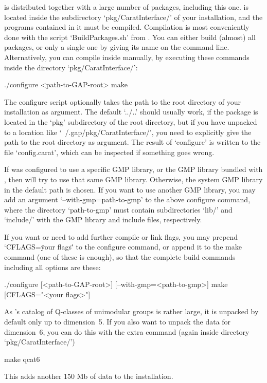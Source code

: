 
{\GAP} is distributed together with a large number of packages, including
this one. {\CaratInterface} is located inside the subdirectory
`pkg/CaratInterface/' of your {\GAP} installation, and the {\CARAT}
programs contained in it must be compiled. Compilation is most
conveniently done with the script `BuildPackages.sh' from {\GAP}.
You can either build (almost) all packages, or only a single one
by giving its name on the command line. Alternatively, you can
compile {\CARAT} inside {\CaratInterface} manually, by executing
these commands inside the directory `pkg/CaratInterface/':

\begintt
./configure <path-to-GAP-root>
make
\endtt

The configure script optionally takes the path to the root directory of 
your {\GAP} installation as argument. The default `../..' should usually 
work, if the package is located in the `pkg' subdirectory of the {\GAP}
root directory,
but if you have unpacked {\CaratInterface} to a location like
`~/.gap/pkg/CaratInterface/', you need to explicitly give the path to
the {\GAP} root directory as argument. The result of `configure' is
written to the file `config.carat', which can be inspected if something
goes wrong.

If {\GAP} was configured to use a specific GMP library, or the GMP library
bundled with {\GAP}, then {\CARAT} will try to use that same GMP library.
Otherwise, the system GMP library in the default path is chosen. If you want
to use another GMP library, you may add an argument `--with-gmp=path-to-gmp'
to the above configure command, where the directory `path-to-gmp' must
contain subdirectories `lib/' and `include/' with the GMP library and include
files, respectively.

If you want or need to add further compile or link flags, you may prepend
`CFLAGS=\"your flags\"' to the configure command, or append it to the make
command (one of these is enough), so that the complete build commands
including all options are these:

\begintt
 [CFLAGS="<your flags>"] ./configure [<path-to-GAP-root>] [--with-gmp=<path-to-gmp>]
 make [CFLAGS="<your flags>"]
\endtt

As {\CARAT}'s catalog of Q-classes of unimodular groups is rather large,
it is unpacked by default only up to dimension~5. If you also want
to unpack the data for dimension~6, you can do this with the extra
command (again inside directory `pkg/CaratInterface/')

\begintt
make qcat6
\endtt

This adds another 150 Mb of data to the installation.
